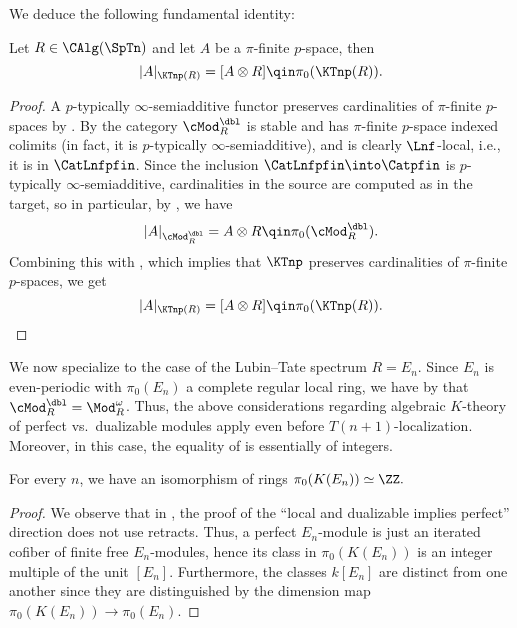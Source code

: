 \documentclass[english]{article}
\begin{document}
We deduce the following fundamental identity:

\begin{prop}\label{card-K}
    Let $R \in \CAlg(\SpTn)$ and let $A$ be a $\pi$-finite $p$-space, then
    \[
        |A|_{\KTnp(R)} = [A\otimes R]
        \qin \pi_0(\KTnp(R)).
    \]
\end{prop}

\begin{proof}
    A $p$-typically $\infty$-semiadditive functor preserves cardinalities of $\pi$-finite $p$-spaces by \cite[Corollary 3.2.7]{TeleAmbi}.
    By \cite[Proposition 2.54 and Proposition 4.15]{moshe2021higher} the category $\cMod_R^\dbl$ is stable and has $\pi$-finite $p$-space indexed colimits (in fact, it is $p$-typically $\infty$-semiadditive), and is clearly $\Lnf$-local, i.e., it is in $\CatLnfpfin$. 
    Since the inclusion $\CatLnfpfin \into \Catpfin$ 
    is $p$-typically $\infty$-semiadditive, cardinalities in the source are computed as in the target, so in particular, by \cite[Proposition 7.6]{moshe2021higher}, we have
    \[
        |A|_{\cMod_R^\dbl} = A\otimes R \qin 
        \pi_0(\cMod_R^\dbl).
    \]
    Combining this with , which implies that $\KTnp$ preserves cardinalities of $\pi$-finite $p$-spaces, we get
    \[
        |A|_{\KTnp(R)} = [A\otimes R] \qin 
        \pi_0(\KTnp(R)).
    \]
\end{proof}

We now specialize to the case of the Lubin--Tate spectrum $R = E_n$. Since $E_n$ is even-periodic with $\pi_0(E_n)$ a complete regular local ring, we have by \cite[Proposition 10.11]{AkhilGalois} that $\cMod_R^\dbl = \Mod_R^\omega$. Thus, the above considerations regarding algebraic $K$-theory of perfect vs.\ dualizable modules apply even before $T(n+1)$-localization. Moreover, in this case, the equality of  is essentially of integers. 

\begin{prop}\label{K0_Z}
    For every $n$, we have an isomorphism of rings
    \(
       \pi_0(K(E_n)) \simeq \ZZ.
    \)
\end{prop}

\begin{proof}
    We observe that in \cite[Proposition 10.11]{AkhilGalois}, the proof of the ``local and dualizable implies perfect'' direction does not use retracts. Thus, a perfect $E_n$-module is just an iterated cofiber of finite free $E_n$-modules, hence its class in $\pi_0(K(E_n))$ is an integer multiple of the unit $[E_n]$.
    Furthermore, the classes $k[E_n]$ are distinct from one another since they are distinguished by the dimension map $\pi_0(K(E_n)) \to \pi_0(E_n)$.
\end{proof}
\end{document}
